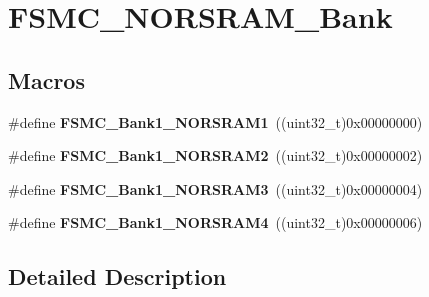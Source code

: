 \hypertarget{group___f_s_m_c___n_o_r_s_r_a_m___bank}{}\section{F\+S\+M\+C\+\_\+\+N\+O\+R\+S\+R\+A\+M\+\_\+\+Bank}
\label{group___f_s_m_c___n_o_r_s_r_a_m___bank}
\subsection*{Macros}
\begin{DoxyCompactItemize}
\item 
\hypertarget{group___f_s_m_c___n_o_r_s_r_a_m___bank_ga514a05828041fa1a13d464c9e4a0a4a9}{}\#define {\bfseries F\+S\+M\+C\+\_\+\+Bank1\+\_\+\+N\+O\+R\+S\+R\+A\+M1}~((uint32\+\_\+t)0x00000000)\label{group___f_s_m_c___n_o_r_s_r_a_m___bank_ga514a05828041fa1a13d464c9e4a0a4a9}

\item 
\hypertarget{group___f_s_m_c___n_o_r_s_r_a_m___bank_gaef52862c652370b9a658478d275dd956}{}\#define {\bfseries F\+S\+M\+C\+\_\+\+Bank1\+\_\+\+N\+O\+R\+S\+R\+A\+M2}~((uint32\+\_\+t)0x00000002)\label{group___f_s_m_c___n_o_r_s_r_a_m___bank_gaef52862c652370b9a658478d275dd956}

\item 
\hypertarget{group___f_s_m_c___n_o_r_s_r_a_m___bank_ga151b02506a318ac77382b52f3b5e16f4}{}\#define {\bfseries F\+S\+M\+C\+\_\+\+Bank1\+\_\+\+N\+O\+R\+S\+R\+A\+M3}~((uint32\+\_\+t)0x00000004)\label{group___f_s_m_c___n_o_r_s_r_a_m___bank_ga151b02506a318ac77382b52f3b5e16f4}

\item 
\hypertarget{group___f_s_m_c___n_o_r_s_r_a_m___bank_ga1083572834aa084d21e6698c280f8f74}{}\#define {\bfseries F\+S\+M\+C\+\_\+\+Bank1\+\_\+\+N\+O\+R\+S\+R\+A\+M4}~((uint32\+\_\+t)0x00000006)\label{group___f_s_m_c___n_o_r_s_r_a_m___bank_ga1083572834aa084d21e6698c280f8f74}

\end{DoxyCompactItemize}


\subsection{Detailed Description}

